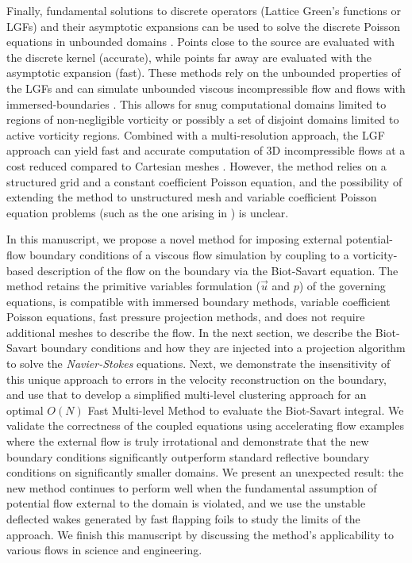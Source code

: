 \documentclass[final,1p,times]{elsarticle}
\begin{document}
Finally, fundamental solutions to discrete operators (Lattice Green's functions or LGFs) and their asymptotic expansions can be used to solve the discrete Poisson equations in unbounded domains \cite{Liska2014AEquations, Beckers2022PlanarGrids}. Points close to the source are evaluated with the discrete kernel (accurate), while points far away are evaluated with the asymptotic expansion (fast). These methods rely on the unbounded properties of the LGFs and can simulate unbounded viscous incompressible flow \cite{Liska2016ADomains} and flows with immersed-boundaries \cite{Liska2017AFunctions}. This allows for snug computational domains limited to regions of non-negligible vorticity or possibly a set of disjoint domains limited to active vorticity regions. Combined with a multi-resolution approach, the LGF approach can yield fast and accurate computation of 3D incompressible flows at a cost reduced compared to Cartesian meshes \cite{Dorschner2020AEquations}. However, the method relies on a structured grid and a constant coefficient Poisson equation, and the possibility of extending the method to unstructured mesh and variable coefficient Poisson equation problems (such as the one arising in \cite{Lauber2022}) is unclear.

In this manuscript, we propose a novel method for imposing external potential-flow boundary conditions of a viscous flow simulation by coupling to a vorticity-based description of the flow on the boundary via the Biot-Savart equation. The method retains the primitive variables formulation ($\vec u$ and $p$) of the governing equations, is compatible with immersed boundary methods, variable coefficient Poisson equations, fast pressure projection methods, and does not require additional meshes to describe the flow. In the next section, we describe the Biot-Savart boundary conditions and how they are injected into a projection algorithm to solve the \emph{Navier-Stokes} equations. Next, we demonstrate the insensitivity of this unique approach to errors in the velocity reconstruction on the boundary, and use that to develop a simplified multi-level clustering approach for an optimal $O(N)$ Fast Multi-level Method to evaluate the Biot-Savart integral. We validate the correctness of the coupled equations using accelerating flow examples where the external flow is truly irrotational and demonstrate that the new boundary conditions significantly outperform standard reflective boundary conditions on significantly smaller domains. We present an unexpected result: the new method continues to perform well when the fundamental assumption of potential flow external to the domain is violated, and we use the unstable deflected wakes generated by fast flapping foils to study the limits of the approach. We finish this manuscript by discussing the method's applicability to various flows in science and engineering.
\end{document}
